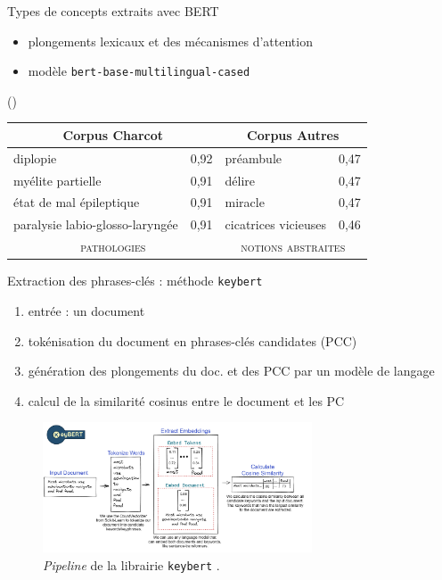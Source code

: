 \begin{frame}{Types de concepts extraits avec \textsc{BERT}}
    \begin{itemize}
        \item plongements lexicaux et des
mécanismes d’attention
        \item modèle \texttt{bert-base-multilingual-cased}
    \end{itemize}
    \begin{flushright}
    {(\small \cite{vaswani2017})}
    \end{flushright}

\begin{table}[]
\begin{tabular}{|ll|ll|}
\hline
\multicolumn{2}{|c|}{\cellcolor[HTML]{EFEFEF}Corpus \textrm{Charcot}} & \multicolumn{2}{c|}{\cellcolor[HTML]{EFEFEF}Corpus \textrm{Autres}}     \\ \hline
\multicolumn{1}{|l|}{diplopie}                & 0,92 & \multicolumn{1}{l|}{préambule}       & 0,47      \\
\multicolumn{1}{|l|}{myélite partielle}       & 0,91 & \multicolumn{1}{l|}{délire}          & 0,47      \\
\multicolumn{1}{|l|}{état de mal épileptique} & 0,91 & \multicolumn{1}{l|}{miracle}         & 0,47      \\
\multicolumn{1}{|l|}{paralysie labio-glosso-laryngée} & 0,91 & \multicolumn{1}{l|}{cicatrices vicieuses} & 0,46 \\ \hline
\multicolumn{2}{|c|}{\cellcolor[HTML]{E1FFE1}\textsc{pathologies}}     & \multicolumn{2}{c|}{\cellcolor[HTML]{FFDFDD}\textsc{notions abstraites}} \\ \hline 
\end{tabular}
\end{table}
\end{frame}

\begin{frame}{Extraction des phrases-clés : méthode \texttt{keybert}}
\begin{enumerate}
\small
\item entrée : un document
\item tokénisation du document en phrases-clés candidates (PCC)
\item génération des plongements du doc. et des PCC par un modèle de langage
\item calcul de la similarité cosinus entre le document et les PC
\end{enumerate}
\begin{figure}
    \centering
    \includegraphics[width=80mm,scale=0.5]{pic/keybert.png}
    \caption{\textit{Pipeline} de la librairie \texttt{keybert} \citep{grootendorst2020keybert}.}
    \label{fig:enter-label}
\end{figure}
\end{frame}

